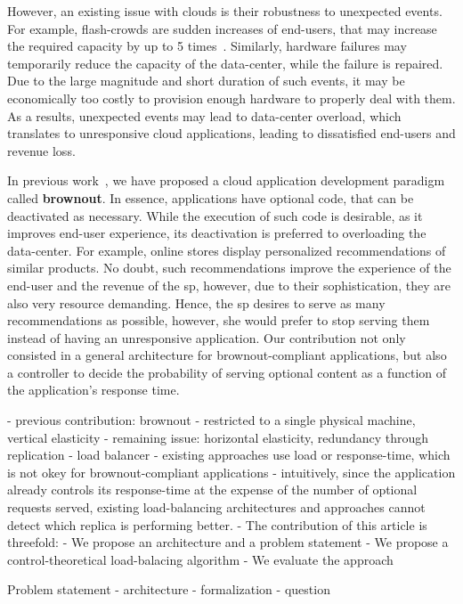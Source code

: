 However, an existing issue with clouds is their robustness to unexpected events. For example, flash-crowds are sudden increases of end-users, that may increase the required capacity by up to 5 times~\cite{PeaksPaperThatMinaPresented}. Similarly, hardware failures may temporarily reduce the capacity of the data-center, while the failure is repaired. Due to the large magnitude and short duration of such events, it may be economically too costly to provision enough hardware to properly deal with them. As a results, unexpected events may lead to data-center overload, which translates to unresponsive cloud applications, leading to dissatisfied end-users and revenue loss.

In previous work~\cite{us}, we have proposed a cloud application development paradigm called {\bf brownout}. In essence, applications have optional code, that can be deactivated as necessary. While the execution of such code is desirable, as it improves end-user experience, its deactivation is preferred to overloading the data-center. For example, online stores display personalized recommendations of similar products. No doubt, such recommendations improve the experience of the end-user and the revenue of the \ac{sp}, however, due to their sophistication, they are also very resource demanding. Hence, the \ac{sp} desires to serve as many recommendations as possible, however, she would prefer to stop serving them instead of having an unresponsive application. Our contribution not only consisted in a general architecture for brownout-compliant applications, but also a controller to decide the probability of serving optional content as a function of the application's response time.

- previous contribution: brownout
- restricted to a single physical machine, vertical elasticity
- remaining issue: horizontal elasticity, redundancy through replication
- load balancer
- existing approaches use load or response-time, which is not okey for brownout-compliant applications
  - intuitively, since the application already controls its response-time at the expense of the number of optional requests served, existing load-balancing architectures and approaches cannot detect which replica is performing better.
- The contribution of this article is threefold:
  - We propose an architecture and a problem statement
  - We propose a control-theoretical load-balacing algorithm
  - We evaluate the approach

Problem statement
- architecture
- formalization
- question


